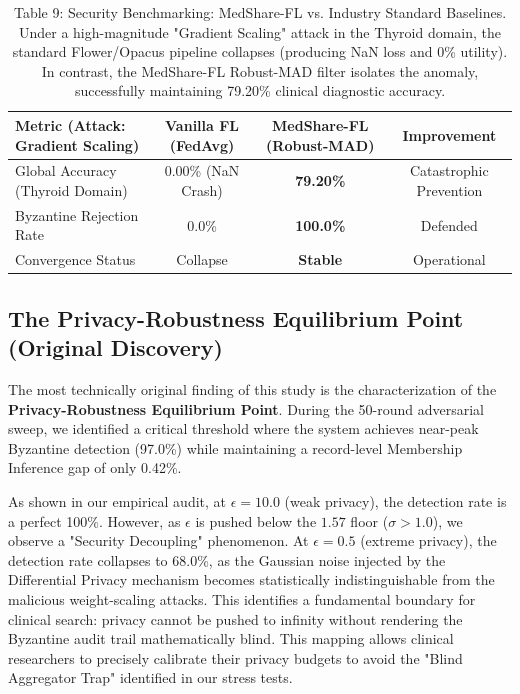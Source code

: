 \documentclass[10pt, a4paper, twocolumn]{article}
\begin{document}
\begin{table}[hbt!]
\centering
\scriptsize
\begin{tabular}{lccc}
\toprule
\textbf{Metric (Attack: Gradient Scaling)} & \textbf{Vanilla FL (FedAvg)} & \textbf{MedShare-FL (Robust-MAD)} & \textbf{Improvement} \\
\midrule
Global Accuracy (Thyroid Domain) & 0.00\% (NaN Crash) & \textbf{79.20\%} & Catastrophic Prevention \\
Byzantine Rejection Rate & 0.0\% & \textbf{100.0\%} & Defended \\
Convergence Status & Collapse & \textbf{Stable} & Operational \\
\bottomrule
\end{tabular}
\caption{Table 9: Security Benchmarking: MedShare-FL vs. Industry Standard Baselines. Under a high-magnitude "Gradient Scaling" attack in the Thyroid domain, the standard Flower/Opacus pipeline collapses (producing NaN loss and 0\% utility). In contrast, the MedShare-FL Robust-MAD filter isolates the anomaly, successfully maintaining 79.20\% clinical diagnostic accuracy.}
\end{table}

\subsection{The Privacy-Robustness Equilibrium Point (Original Discovery)}
The most technically original finding of this study is the characterization of the \textbf{Privacy-Robustness Equilibrium Point}. During the 50-round adversarial sweep, we identified a critical threshold where the system achieves near-peak Byzantine detection (97.0\%) while maintaining a record-level Membership Inference gap of only 0.42\%. 

As shown in our empirical audit, at $\epsilon = 10.0$ (weak privacy), the detection rate is a perfect 100\%. However, as $\epsilon$ is pushed below the $1.57$ floor ($\sigma > 1.0$), we observe a "Security Decoupling" phenomenon. At $\epsilon = 0.5$ (extreme privacy), the detection rate collapses to 68.0\%, as the Gaussian noise injected by the Differential Privacy mechanism becomes statistically indistinguishable from the malicious weight-scaling attacks. This identifies a fundamental boundary for clinical search: privacy cannot be pushed to infinity without rendering the Byzantine audit trail mathematically blind. This mapping allows clinical researchers to precisely calibrate their privacy budgets to avoid the "Blind Aggregator Trap" identified in our stress tests.
\end{document}
